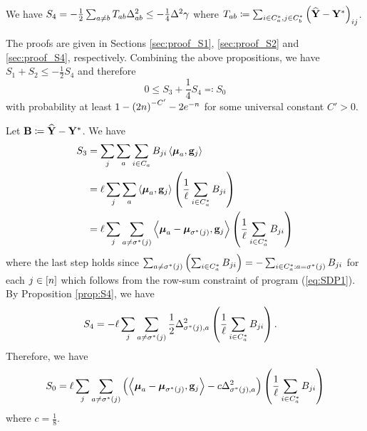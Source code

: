 \begin{prop}
\label{prop:S4} We have $S_{4}=-\frac{1}{2}\sum_{a\ne b}T_{ab}\Delta_{ab}^{2}\le-\frac{1}{4}\Delta^{2}\gamma$
where $T_{ab}\coloneqq\sum_{i\in C_{a}^{*},j\in C_{b}^{*}}\left(\widehat{\mathbf{Y}}-\mathbf{Y}^{*}\right)_{ij}$. 
\end{prop}
The proofs are given in Sections \ref{sec:proof_S1}, \ref{sec:proof_S2}
and \ref{sec:proof_S4}, respectively. Combining the above propositions,
we have $S_{1}+S_{2}\le-\frac{1}{2}S_{4}$ and therefore 
\begin{equation}
0\leq S_{3}+\frac{1}{4}S_{4}\eqqcolon S_{0}\label{eq:error_S3_bound}
\end{equation}
with probability at least $1-\left(2n\right)^{-C'}-2e^{-n}$
for some universal constant $C'>0$.

Let $\mathbf{B}\coloneqq\widehat{\mathbf{Y}}-\mathbf{Y}^{*}$. We have 
\begin{align*}
S_{3} & =\sum_{j}\sum_{a}\sum_{i\in C_{a}}B_{ji}\left\langle \boldsymbol{\mu}_{a},\mathbf{g}_{j}\right\rangle \\
 & =\ell\sum_{j}\sum_{a}\left\langle \boldsymbol{\mu}_{a},\mathbf{g}_{j}\right\rangle \left(\frac{1}{\ell}\sum_{i\in C_{a}^{*}}B_{ji}\right)\\
 & =\ell\sum_{j}\sum_{a\ne\sigma^{*}(j)}\left\langle \boldsymbol{\mu}_{a}-\boldsymbol{\mu}_{\sigma^{*}(j)},\mathbf{g}_{j}\right\rangle \left(\frac{1}{\ell}\sum_{i\in C_{a}^{*}}B_{ji}\right)
\end{align*}
where the last step holds since $\sum_{a\ne\sigma^{*}(j)}\left(\sum_{i\in C_{a}^{*}}B_{ji}\right)=-\sum_{i\in C_{a}^{*}:a=\sigma^{*}(j)}B_{ji}$
for each $j\in\left[n\right]$ which follows from the row-sum constraint
of program (\ref{eq:SDP1}). By Proposition \ref{prop:S4}, we have
\begin{align*}
S_{4} & =-\ell\sum_{j}\sum_{a\ne\sigma^{*}(j)}\frac{1}{2}\Delta_{\sigma^{*}(j),a}^{2}\left(\frac{1}{\ell}\sum_{i\in C_{a}^{*}}B_{ji}\right).
\end{align*}
Therefore, we have 
\[
S_{0}=\ell\sum_{j}\sum_{a\ne\sigma^{*}(j)}\left(\left\langle \boldsymbol{\mu}_{a}-\boldsymbol{\mu}_{\sigma^{*}(j)},\mathbf{g}_{j}\right\rangle -c\Delta_{\sigma^{*}(j),a}^{2}\right)\left(\frac{1}{\ell}\sum_{i\in C_{a}^{*}}B_{ji}\right)
\]
where $c=\frac{1}{8}$.

